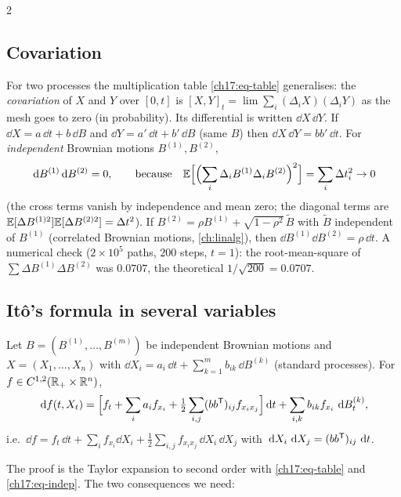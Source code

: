 \begin{paracol}{2}
\subsection{Covariation}
For two processes the multiplication table \eqref{ch17:eq-table} generalises: the \emph{covariation} of $X$ and $Y$ over $[0,t]$ is $[X,Y]_t=\lim\sum_i(\Delta_iX)(\Delta_iY)$ as the mesh goes to zero (in probability). Its differential is written
$\dd X\,\dd Y$. If $\dd X=a\,\dd t+b\,\dd B$ and $\dd Y=a'\,\dd t+b'\,\dd B$ (same $B$) then $\dd X\,\dd Y=bb'\,\dd t$.
For \emph{independent} Brownian motions $B^{(1)},B^{(2)}$,
\begin{equation}\label{ch17:eq-indep}
  \,\mathrm{d} B^{(1)}\,\mathrm{d} B^{(2)}=0 ,\qquad\text{because}\quad \mathbb{E}\Bigl[\Bigl(\sum_i\Delta_iB^{(1)}\Delta_iB^{(2)}\Bigr)^2\Bigr]=\sum_i\Delta t_i^2\to0
\end{equation}
(the cross terms vanish by independence and mean zero; the diagonal terms are $\mathbb{E}[\Delta B^{(1)2}]\allowbreak\mathbb{E}[\Delta B^{(2)2}]=\Delta t^2$). If $B^{(2)}=\rho B^{(1)}+\sqrt{1-\rho^2}\,\widetilde B$ with $\widetilde B$ independent of $B^{(1)}$ (correlated Brownian motions, \cref{ch:linalg}), then $\dd B^{(1)}\dd B^{(2)}=\rho\,\dd t$.
A numerical check ($2\times10^5$ paths, $200$ steps, $t=1$): the root-mean-square of $\sum\Delta B^{(1)}\Delta B^{(2)}$ was $0.0707$, the theoretical $1/\sqrt{200}=0.0707$.

\subsection{It\^o's formula in several variables}
\begin{theorem}\label{ch17:thm-multi}
Let $B=(B^{(1)},\dots,B^{(m)})$ be independent Brownian motions and $X=(X_1,\dots,X_n)$ with $\dd X_i=a_i\,\dd t+\sum_{k=1}^mb_{ik}\,\dd B^{(k)}$ (standard processes). For $f\in C^{1,2}(\mathbb{R}_+\times\mathbb{R}^n)$,
\begin{equation}\label{ch17:eq-multi}
  \,\mathrm{d} f(t,X_t)=\Bigl[f_t+\sum_ia_if_{x_i}+\tfrac12\sum_{i,j}(bb^{\mathsf T})_{ij}f_{x_ix_j}\Bigr]\,\mathrm{d} t+\sum_{i,k}b_{ik}f_{x_i}\,\,\mathrm{d} B^{(k)}_t ,
\end{equation}
i.e.\ $\dd f=f_t\,\dd t+\sum_if_{x_i}\dd X_i+\tfrac12\sum_{i,j}f_{x_ix_j}\,\dd X_i\,\dd X_j$ with $\,\mathrm{d} X_i\,\,\mathrm{d} X_j=(bb^{\mathsf T})_{ij}\,\,\mathrm{d} t$.
\end{theorem}
The proof is the Taylor expansion to second order with \eqref{ch17:eq-table} and \eqref{ch17:eq-indep}. The two consequences we need:


\end{paracol}
